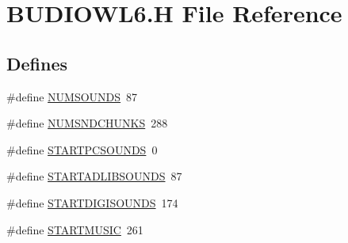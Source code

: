 \hypertarget{BUDIOWL6_8H}{
\section{BUDIOWL6.H File Reference}
\label{BUDIOWL6_8H}
}
\subsection*{Defines}
\begin{DoxyCompactItemize}
\item 
\#define \hyperlink{BUDIOWL6_8H_aa948e91a657468d5faa690ec1a89230b}{NUMSOUNDS}~87
\item 
\#define \hyperlink{BUDIOWL6_8H_adb660029e11963733384781d8bd6dc24}{NUMSNDCHUNKS}~288
\item 
\#define \hyperlink{BUDIOWL6_8H_a1c2885b0208a74942feaa303bb5b1119}{STARTPCSOUNDS}~0
\item 
\#define \hyperlink{BUDIOWL6_8H_a7d40bf6bf62cde9ae5f212e063328200}{STARTADLIBSOUNDS}~87
\item 
\#define \hyperlink{BUDIOWL6_8H_adb5a42984ba81d350a944cc41434a6f7}{STARTDIGISOUNDS}~174
\item 
\#define \hyperlink{BUDIOWL6_8H_acdd20a00d56efe82715df1d7a2facc10}{STARTMUSIC}~261
\end{DoxyCompactItemize}

